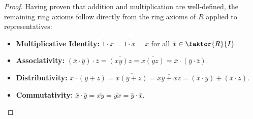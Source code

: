 \begin{content}

\begin{proof}
Having proven that addition and multiplication are well-defined, the remaining ring axioms follow directly from the ring axioms of $R$ applied to representatives:
\begin{itemize}
    \item \textbf{Multiplicative Identity:} $\bar{1} \cdot \bar{x} = \overline{1 \cdot x} = \bar{x}$ for all $\bar{x} \in \faktor{R}{I}$.
    \item \textbf{Associativity:} $(\bar{x} \cdot \bar{y}) \cdot \bar{z} = \overline{(x y) z} = \overline{x (y z)} = \bar{x} \cdot (\bar{y} \cdot \bar{z})$.
    \item \textbf{Distributivity:} $\bar{x} \cdot (\bar{y} + \bar{z}) = \overline{x (y + z)} = \overline{x y + x z} = (\bar{x} \cdot \bar{y}) + (\bar{x} \cdot \bar{z})$.
    \item \textbf{Commutativity:} $\bar{x} \cdot \bar{y} = \overline{x y} = \overline{y x} = \bar{y} \cdot \bar{x}$.
\end{itemize}
\end{proof}
\end{content}

\begin{hidden}
\end{hidden}


